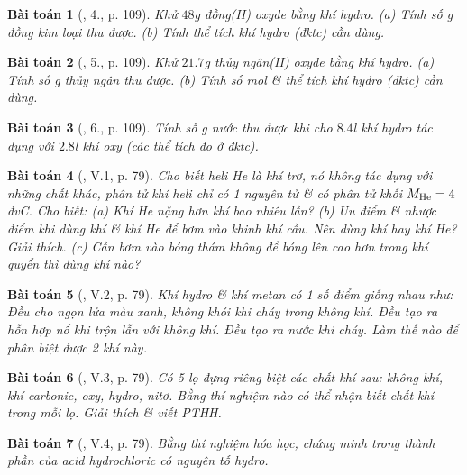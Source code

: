 \documentclass{article}
\newtheorem{baitoan}{Bài toán}
\begin{document}
\begin{baitoan}[\cite{SGK_Hoa_Hoc_8}, 4., p. 109]
	Khử $48$\emph{g} đồng(II) oxyde bằng khí hydro. (a) Tính số \emph{g} đồng kim loại thu được. (b) Tính thể tích khí hydro (đktc) cần dùng.
\end{baitoan}

\begin{baitoan}[\cite{SGK_Hoa_Hoc_8}, 5., p. 109]
	Khử $21.7$\emph{g} thủy ngân(II) oxyde bằng khí hydro. (a) Tính số \emph{g} thủy ngân thu được. (b) Tính số mol \& thể tích khí hydro (đktc) cần dùng.
\end{baitoan}

\begin{baitoan}[\cite{SGK_Hoa_Hoc_8}, 6., p. 109]
	Tính số \emph{g} nước thu được khi cho $8.4$\emph{l} khí hydro tác dụng với $2.8$\emph{l} khí oxy (các thể tích đo ở đktc).
\end{baitoan}

\begin{baitoan}[\cite{Truong_BTNC_Hoa_Hoc_8_2022}, V.1, p. 79]
	Cho biết heli \emph{He} là khí trơ, nó không tác dụng với những chất khác, phân tử khí heli chỉ có 1 nguyên tử \& có phân tử khối $M_{\rm He} = 4$đvC. Cho biết: (a) Khí \emph{He} nặng hơn khí \emph{} bao nhiêu lần? (b) Ưu điểm \& nhược điểm khi dùng khí \emph{} \& khí \emph{He} để bơm vào khinh khí cầu. Nên dùng khí \emph{} hay khí \emph{He}? Giải thích. (c) Cần bơm vào bóng thám không để bóng lên cao hơn trong khí quyển thì dùng khí nào?
\end{baitoan}

\begin{baitoan}[\cite{Truong_BTNC_Hoa_Hoc_8_2022}, V.2, p. 79]
	Khí hydro \& khí metan có 1 số điểm giống nhau như: Đều cho ngọn lửa màu xanh, không khói khi cháy trong không khí. Đều tạo ra hỗn hợp nổ khi trộn lẫn với không khí. Đều tạo ra nước khi cháy. Làm thế nào để phân biệt được 2 khí này.
\end{baitoan}

\begin{baitoan}[\cite{Truong_BTNC_Hoa_Hoc_8_2022}, V.3, p. 79]
	Có 5 lọ đựng riêng biệt các chất khí sau: không khí, khí carbonic, oxy, hydro, nitơ. Bằng thí nghiệm nào có thể nhận biết chất khí trong mỗi lọ. Giải thích \& viết PTHH.
\end{baitoan}

\begin{baitoan}[\cite{Truong_BTNC_Hoa_Hoc_8_2022}, V.4, p. 79]
	Bằng thí nghiệm hóa học, chứng minh trong thành phần của acid hydrochloric có nguyên tố hydro.
\end{baitoan}
\end{document}
